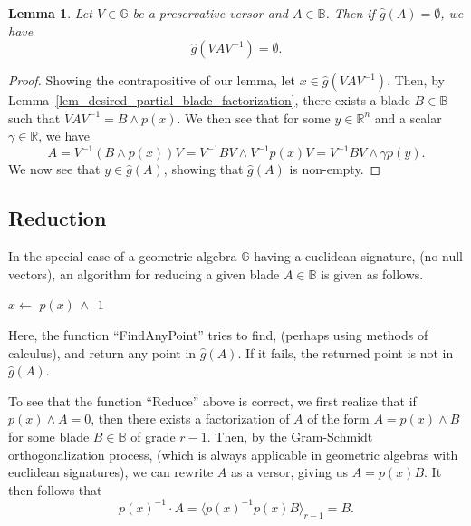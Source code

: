 \documentclass{birkjour}
\newtheorem{lem}[thm]{Lemma}
\theoremstyle{definition}
\theoremstyle{remark}
\numberwithin{equation}{section}
\newcommand{\R}{\mathbb{R}}
\newcommand{\B}{\mathbb{B}}
\newcommand{\G}{\mathbb{G}}
\newcommand{\gh}{\hat{g}}
\begin{document}
\begin{lem}\label{lem_empty_blade_transforms_as_empty_blade}
Let $V\in\G$ be a preservative versor and $A\in\B$.  Then if $\gh(A)=\emptyset$, we have
\begin{equation}
\gh(VAV^{-1})=\emptyset.
\end{equation}
\end{lem}
\begin{proof}
Showing the contrapositive of our lemma, let $x\in\gh(VAV^{-1})$.  Then, by Lemma~\ref{lem_desired_partial_blade_factorization},
there exists a blade $B\in\B$ such that $VAV^{-1}=B\wedge p(x)$.  We then see that for
some $y\in\R^n$ and a scalar $\gamma\in\R$, we have
\begin{equation}
A = V^{-1}(B\wedge p(x))V = V^{-1}BV\wedge V^{-1}p(x)V = V^{-1}BV\wedge \gamma p(y).
\end{equation}
We now see that $y\in\gh(A)$, showing that $\gh(A)$ is non-empty.
\end{proof}

\subsection{Reduction}

In the special case of a geometric algebra $\G$ having a euclidean signature, (no null vectors),
an algorithm for reducing a given blade $A\in\B$ is given as follows.

\begin{algorithmic}
	\State $x\gets$
		\State\Return $p(x)\,\wedge\,$
	\EndIf
	\State\Return $1$
\EndFunction
\end{algorithmic}
Here, the function ``FindAnyPoint'' tries to find, (perhaps using methods of calculus), and return any point in $\gh(A)$.
If it fails, the returned point is not in $\gh(A)$.

To see that the function ``Reduce'' above is correct, we first realize that if $p(x)\wedge A=0$,
then there exists a factorization of $A$ of the form $A=p(x)\wedge B$ for some blade $B\in\B$
of grade $r-1$.
Then, by the Gram-Schmidt orthogonalization process, (which is always
applicable in geometric algebras with euclidean signatures), we can rewrite $A$ as a versor,
giving us $A=p(x)B$.  It then follows that
\begin{equation}
p(x)^{-1}\cdot A = \langle p(x)^{-1}p(x) B\rangle_{r-1}=B.
\end{equation}
\end{document}
